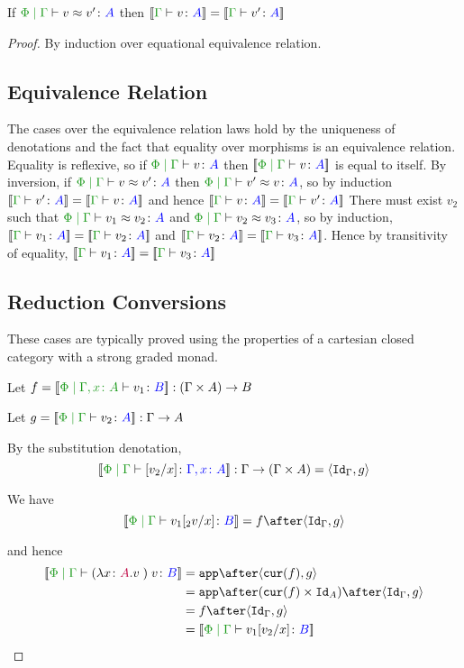 \documentclass{report}
\begin{document}
\begin{theorem}[Soundness]
    If $\eberelation{\P}{\G}{v}{v'}{A}$ then $\gdenoequality{v}{v'}{A}$
\end{theorem}

\begin{framed}
    \begin{proof}
        By induction over equational equivalence relation.
        \subsection{Equivalence Relation}
        The cases over the equivalence relation laws hold by the uniqueness of denotations and the fact that equality over morphisms is an equivalence relation.
        Equality is reflexive, so if $\gpetyperelation{v}{A}$ then $\deno{\gpetyperelation{v}{A}}$ is equal to itself.
        \case{\eqsymmetric}
        By inversion, if $\gpeberelation{v}{v'}{A}$ then $\gpeberelation{v'}{v}{A}$, so by induction $\gdenoequality{v'}{v}{A}$ and hence $\gdenoequality{v}{v'}{A}$
        \case{\eqtransitive}
        There must exist $v_2$ such that $\gpeberelation{v_1}{v_2}{A}$ and $\gpeberelation{v_2}{v_3}{A}$, so by induction,
        $\gdenoequality{v_1}{v_2}{A}$ and $\gdenoequality{v_2}{v_3}{A}$. Hence by transitivity of equality, $\gdenoequality{v_1}{v_3}{A}$
        
        \subsection{Reduction Conversions}
        These cases are typically proved using the properties of a cartesian closed category with a strong graded monad.
        
        \case{\eqbeta}
            Let $f = \deno{\etyperelation{\P}{\gax}{v_1}{B}}: (\G \times A) \rightarrow B$
        
            Let $g = \deno{\gpetyperelation{v_2}{A}}: \G \rightarrow A$
        
            By the substitution denotation, $$\deno{\etyperelation{\P}{\G}{\ssub{x}{v_2}}{\gax}}: \G \rightarrow (\G \times A) = \pr{\idg}{g}$$
        
            We have $$\deno{\gpetyperelation{v_1\ssub{x}{_2v}}{B}} = f \after \pr{\idg}{g}$$
        
            and hence
            \begin{align*}
                    \deno{\gpetyperelation{\apply{(\lam{x}{A}{v})}{v}}{B}} & = \app\after\pr{\cur{f}}{g} \\
                    & = \app\after(\cur{f}\times\Id{A})\after\pr{\idg}{g}\\
                    & = f \after \pr{\idg}{g} \\
                    & = \deno{\gpetyperelation{v_1\ssub{x}{v_2}}{B}}  
            \end{align*}
           

\end{proof}
\end{framed}
\end{document}
